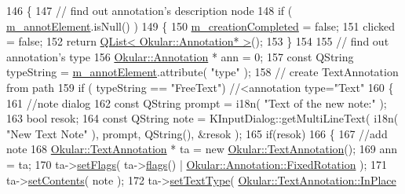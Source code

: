 \begin{DoxyCode}
146         \{
147             \textcolor{comment}{// find out annotation's description node}
148             \textcolor{keywordflow}{if} ( \hyperlink{classAnnotatorEngine_ac95af6291cc2f0c601e1bbf8a5e6a0bd}{m\_annotElement}.isNull() )
149             \{
150                 \hyperlink{classAnnotatorEngine_a0df119b4d87a1e3ea8ed60a96d7ff444}{m\_creationCompleted} = \textcolor{keyword}{false};
151                 clicked = \textcolor{keyword}{false};
152                 \textcolor{keywordflow}{return} \hyperlink{classQList}{QList< Okular::Annotation* >}();
153             \}
154 
155             \textcolor{comment}{// find out annotation's type}
156             \hyperlink{classOkular_1_1Annotation}{Okular::Annotation} * ann = 0;
157             \textcolor{keyword}{const} QString typeString = \hyperlink{classAnnotatorEngine_ac95af6291cc2f0c601e1bbf8a5e6a0bd}{m\_annotElement}.attribute( \textcolor{stringliteral}{"type"} );
158             \textcolor{comment}{// create TextAnnotation from path}
159             \textcolor{keywordflow}{if} ( typeString == \textcolor{stringliteral}{"FreeText"})  \textcolor{comment}{//<annotation type="Text"}
160             \{
161                 \textcolor{comment}{//note dialog}
162                 \textcolor{keyword}{const} QString prompt = i18n( \textcolor{stringliteral}{"Text of the new note:"} );
163                 \textcolor{keywordtype}{bool} resok;
164                 \textcolor{keyword}{const} QString note = KInputDialog::getMultiLineText( i18n( \textcolor{stringliteral}{"New Text Note"} ), prompt, 
      QString(), &resok );
165                 \textcolor{keywordflow}{if}(resok)
166                 \{
167                     \textcolor{comment}{//add note}
168                     \hyperlink{classOkular_1_1TextAnnotation}{Okular::TextAnnotation} * ta = \textcolor{keyword}{new} 
      \hyperlink{classOkular_1_1TextAnnotation}{Okular::TextAnnotation}();
169                     ann = ta;
170                     ta->\hyperlink{classOkular_1_1Annotation_ab91b36dc7ecfd9cacba7761ec58145fd}{setFlags}( ta->\hyperlink{classOkular_1_1Annotation_a3d6f7ee5057155b90e76c24768880947}{flags}() | 
      \hyperlink{classOkular_1_1Annotation_a8a214541446745761efeda70b3a4302ea31a80c8e10831d2dccdf80cadb74fb3c}{Okular::Annotation::FixedRotation} );
171                     ta->\hyperlink{classOkular_1_1Annotation_a65a7316062031c6fdf578835245ddbd1}{setContents}( note );
172                     ta->\hyperlink{classOkular_1_1TextAnnotation_aa755aebfdc64ce680064d4e9f64dde92}{setTextType}( \hyperlink{classOkular_1_1TextAnnotation_af560204454bf812797bc95bea730b06ea2a746e9125e8cf53627335a8af01b998}{Okular::TextAnnotation::InPlace}

\end{DoxyCode}
